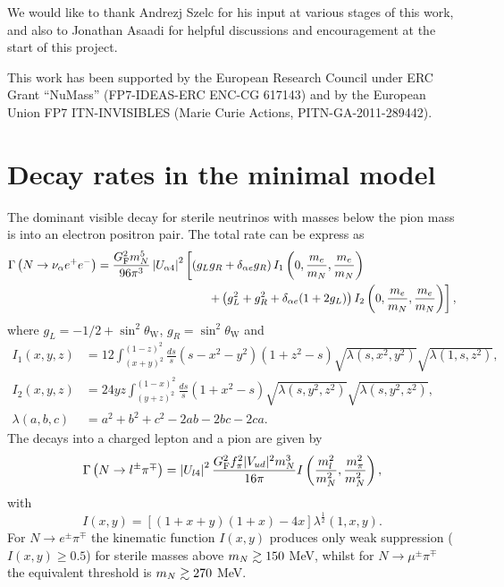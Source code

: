 \documentclass[11pt, a4paper]{article}
\def\ster{\ensuremath N}
\begin{document}
\acknowledgments

We would like to thank Andrezj Szelc for his input at various stages of this
work, and also to Jonathan Asaadi for helpful discussions and encouragement at
the start of this project.

This work has been supported by the European Research Council under ERC Grant
“NuMass” (FP7-IDEAS-ERC ENC-CG 617143) and by the European Union FP7
ITN-INVISIBLES (Marie Curie Actions, PITN-GA-2011-289442).

\appendix

\section{\label{app:decayrates}Decay rates in the minimal model}

The dominant visible decay for sterile neutrinos with masses below the pion
mass is into an electron positron pair. The total rate can be express as
%
\begin{align*} \Gamma\left(\ster\to \nu_\alpha e^+e^-\right) =
\frac{G_\text{F}^2m_\ster^5}{96\pi^3}\left|U_{\alpha 4}\right|^2&\left[\left( g_Lg_R + \delta_{\alpha e}g_R\right)I_1\left(0,\frac{m_e}{m_\ster}, \frac{
m_e}{m_\ster}\right)\right.\\ 
&\left.\qquad + \left(g_L^2 + g_R^2 + \delta_{\alpha e}(1+2g_L)\right)I_2\left(0,\frac{m_e}{m_\ster},\frac{m_e}{m_\ster}\right)\right],  \end{align*}
%
where $g_L = -1/2 + \sin^2\theta_\text{W}$, $g_R = \sin^2\theta_\text{W}$ and
% 
\begin{align*} I_1(x,y,z) & =12 \int_{(x+y)^2}^{(1-z)^2}
\frac{ds}{s}(s-x^2-y^2)(1+z^2-s)\sqrt{\lambda(s,x^2,y^2)}\sqrt{\lambda(1,s,z^2)},\\
I_2(x,y,z)& =24yz\int_{(y+z)^2}^{(1-x)^2}\frac{ds}{s}\left(1+x^2-s\right)\sqrt{\lambda\left(s,y^2,z^2\right)}\sqrt{\lambda\left(s,y^2,z^2\right)},\\
\lambda(a,b,c) &= a^2+b^2+c^2 - 2ab-2bc-2ca.  \end{align*}
%
The decays into a charged lepton and a pion are given by 
%
\[ \Gamma\left(\ster\to l^\pm\pi^\mp\right) =
\left|U_{l4}\right|^2\frac{G_\text{F}^2f_\pi^2 |V_{ud}|^2
m_\ster^3}{16\pi}I\left(\frac{m_l^2}{m_\ster^2} ,
\frac{m_\pi^2}{m_\ster^2}\right) , \] 
%
with \[ I(x,y) = \left[ \left( 1+x+y\right) \left(1+x\right) -4 x\right]
\lambda^\frac{1}{2}\left(1,x,y\right).  \]
%
For $N\to e^\pm\pi^\mp$ the kinematic function $I(x,y)$ produces only weak suppression ($I(x,y)\geq 0.5$) for sterile masses above $m_\ster\gtrsim 150$ MeV, whilst for $N\to
\mu^\pm\pi^\mp$ the equivalent threshold is $m_\ster\gtrsim 270$ MeV.
\end{document}
